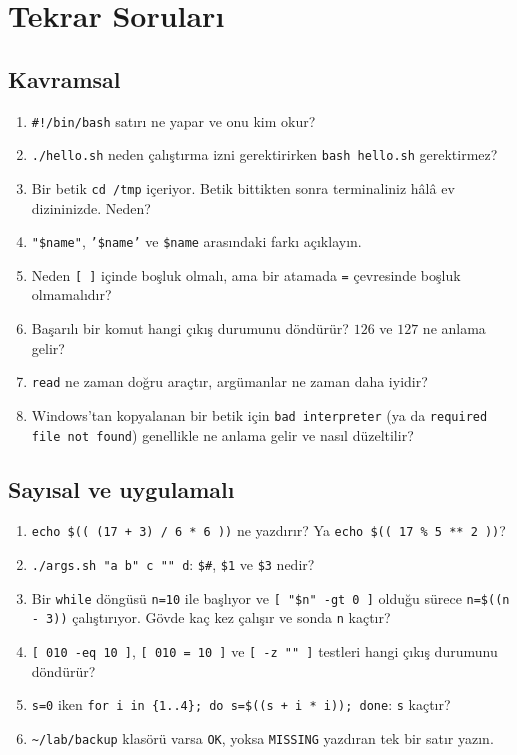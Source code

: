 \section{Tekrar Soruları}

\subsection*{Kavramsal}
\begin{enumerate}[leftmargin=1.6em]
  \item \texttt{\#!/bin/bash} satırı ne yapar ve onu kim okur?
  \item \texttt{./hello.sh} neden çalıştırma izni gerektirirken \texttt{bash hello.sh} gerektirmez?
  \item Bir betik \texttt{cd /tmp} içeriyor. Betik bittikten sonra terminaliniz hâlâ ev dizininizde. Neden?
  \item \texttt{"\$name"}, \texttt{'\$name'} ve \texttt{\$name} arasındaki farkı açıklayın.
  \item Neden \texttt{[ ]} içinde boşluk olmalı, ama bir atamada \texttt{=} çevresinde boşluk olmamalıdır?
  \item Başarılı bir komut hangi çıkış durumunu döndürür? $126$ ve $127$ ne anlama gelir?
  \item \texttt{read} ne zaman doğru araçtır, argümanlar ne zaman daha iyidir?
  \item Windows'tan kopyalanan bir betik için \texttt{bad interpreter} (ya da \texttt{required file not found}) genellikle ne anlama gelir ve nasıl düzeltilir?
\end{enumerate}

\subsection*{Sayısal ve uygulamalı}
\begin{enumerate}[leftmargin=1.6em,resume]
  \item \texttt{echo \$(( (17 + 3) / 6 * 6 ))} ne yazdırır? Ya \texttt{echo \$(( 17 \% 5 ** 2 ))}?
  \item \texttt{./args.sh "a b" c "" d}: \texttt{\$\#}, \texttt{\$1} ve \texttt{\$3} nedir?
  \item Bir \texttt{while} döngüsü \texttt{n=10} ile başlıyor ve \texttt{[ "\$n" -gt 0 ]} olduğu sürece \texttt{n=\$((n - 3))} çalıştırıyor. Gövde kaç kez çalışır ve sonda \texttt{n} kaçtır?
  \item \texttt{[ 010 -eq 10 ]}, \texttt{[ 010 = 10 ]} ve \texttt{[ -z "" ]} testleri hangi çıkış durumunu döndürür?
  \item \texttt{s=0} iken \texttt{for i in \{1..4\}; do s=\$((s + i * i)); done}: \texttt{s} kaçtır?
  \item \texttt{\textasciitilde/lab/backup} klasörü varsa \texttt{OK}, yoksa \texttt{MISSING} yazdıran tek bir satır yazın.
\end{enumerate}


